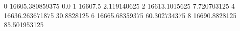 0 16605.380859375 0.0
1 16607.5 2.119140625
2 16613.1015625 7.720703125
4 16636.263671875 30.8828125
6 16665.68359375 60.302734375
8 16690.8828125 85.501953125
